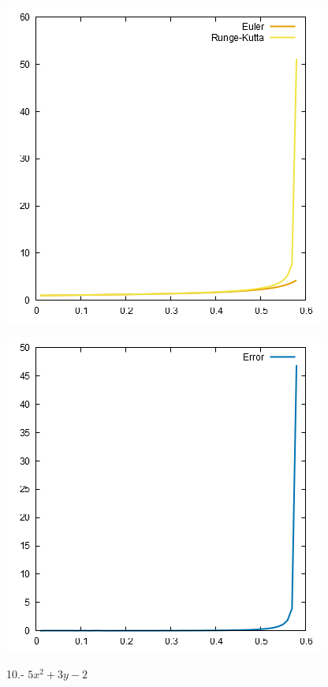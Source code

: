 \documentclass[10pt]{article}
\begin{document}
\begin{multicols}{2}
\begin{center}
				\includegraphics[scale=0.4]{../Graficas/9.png}
			\end{center}
			\begin{center}
				\includegraphics[scale=0.4]{../Graficas/9_1.png}
			\end{center}
			10.- $5x^2+3y-2$
			\begin{center}

\end{center}
\end{multicols}
\end{document}

